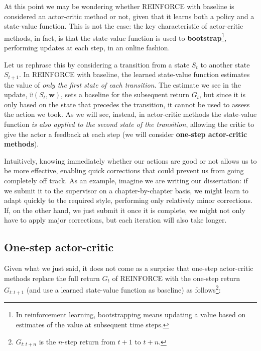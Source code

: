 At this point we may be wondering whether REINFORCE with baseline is considered an actor-critic method or not, given that it learns both a policy and a state-value function. This is not the case: the key characteristic of actor-critic methods, in fact, is that the state-value function is used to \textbf{bootstrap}\footnote{In reinforcement learning, bootstrapping means updating a value based on estimates of the value at subsequent time steps.}, performing updates at each step, in an online fashion.

Let us rephrase this by considering a transition from a state $S_t$ to another state $S_{t+1}$. In REINFORCE with baseline, the learned state-value function estimates the value of \textit{only the first state of each transition}. The estimate we see in the update, $\hat{v}(S_t,\boldsymbol{w})$, sets a baseline for the subsequent return $G_t$, but since it is only based on the state that precedes the transition, it cannot be used to assess the action we took. As we will see, instead, in actor-critic methods the state-value function \textit{is also applied to the second state of the transition}, allowing the critic to give the actor a feedback at each step (we will consider \textbf{one-step actor-critic methods}).

Intuitively, knowing immediately whether our actions are good or not allows us to be more effective, enabling quick corrections that could prevent us from going completely off track. As an example, imagine we are writing our dissertation: if we submit it to the supervisor on a chapter-by-chapter basis, we might learn to adapt quickly to the required style, performing only relatively minor corrections. If, on the other hand, we just submit it once it is complete, we might not only have to apply major corrections, but each iteration will also take longer.

\subsection{One-step actor-critic}
Given what we just said, it does not come as a surprise that one-step actor-critic methods replace the full return $G_t$ of REINFORCE with the one-step return $G_{t:t+1}$ (and use a learned state-value function as baseline) as follows\footnote{$G_{t:t+n}$ is the $n$-step return from $t+1$ to $t+n$.}:

